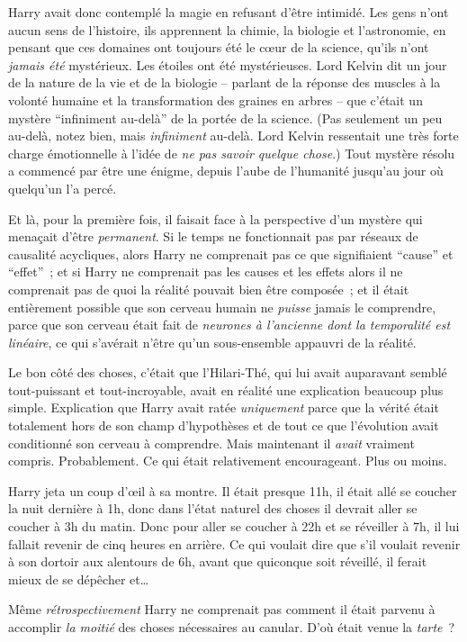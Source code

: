 Harry avait donc contemplé la magie en refusant d'être intimidé.
Les gens n'ont aucun sens de l'histoire, ils apprennent la chimie, la biologie et l'astronomie, en pensant que ces domaines ont toujours été le cœur de la science, qu'ils n'ont \emph{jamais été} mystérieux.
Les étoiles ont été mystérieuses.
Lord Kelvin dit un jour de la nature de la vie et de la biologie -- parlant de la réponse des muscles à la volonté humaine et la transformation des graines en arbres -- que c'était un mystère “infiniment au-delà” de la portée de la science.
(Pas seulement un peu au-delà, notez bien, mais \emph{infiniment} au-delà.
Lord Kelvin ressentait une très forte charge émotionnelle à l'idée de \emph{ne pas savoir quelque chose}.)
Tout mystère résolu a commencé par être une énigme, depuis l'aube de l'humanité jusqu'au jour où quelqu'un l'a percé.

Et là, pour la première fois, il faisait face à la perspective d'un mystère qui menaçait d'être \emph{permanent}.
Si le temps ne fonctionnait pas par réseaux de causalité acycliques, alors Harry ne comprenait pas ce que signifiaient “cause” et “effet”~;
et si Harry ne comprenait pas les causes et les effets alors il ne comprenait pas de quoi la réalité pouvait bien être composée~;
et il était entièrement possible que son cerveau humain ne \emph{puisse} jamais le comprendre, parce que son cerveau était fait de \emph{neurones à l'ancienne dont la temporalité est linéaire}, ce qui s'avérait n'être qu'un sous-ensemble appauvri de la réalité.

Le bon côté des choses, c'était que l'Hilari-Thé, qui lui avait auparavant semblé tout-puissant et tout-incroyable, avait en réalité une explication beaucoup plus simple.
Explication que Harry avait ratée \emph{uniquement} parce que la vérité était totalement hors de son champ d'hypothèses et de tout ce que l'évolution avait conditionné son cerveau à comprendre.
Mais maintenant il \emph{avait} vraiment compris. Probablement.
Ce qui était relativement encourageant. Plus ou moins.

Harry jeta un coup d'œil à sa montre.
Il était presque 11h, il était allé se coucher la nuit dernière à 1h, donc dans l'état naturel des choses il devrait aller se coucher à 3h du matin.
Donc pour aller se coucher à 22h et se réveiller à 7h, il lui fallait revenir de cinq heures en arrière.
Ce qui voulait dire que s'il voulait revenir à son dortoir aux alentours de 6h, avant que quiconque soit réveillé, il ferait mieux de se dépêcher et…

Même \emph{rétrospectivement} Harry ne comprenait pas comment il était parvenu à accomplir \emph{la moitié} des choses nécessaires au canular.
D'où était venue la \emph{tarte}~?


